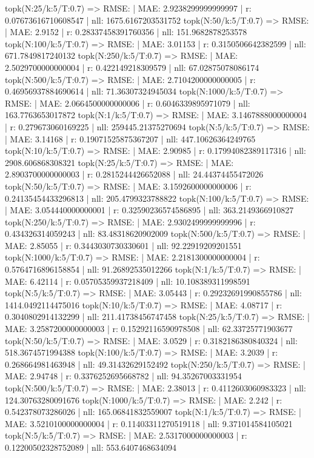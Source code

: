topk(N:25/k:5/T:0.7) => RMSE: | MAE: 2.9238299999999997 | r: 0.07673616710608547 | nll: 1675.6167203531752
topk(N:50/k:5/T:0.7) => RMSE: | MAE: 2.9152 | r: 0.28337458391760356 | nll: 151.9682878253578
topk(N:100/k:5/T:0.7) => RMSE: | MAE: 3.01153 | r: 0.3150506642382599 | nll: 671.7849817240132
topk(N:250/k:5/T:0.7) => RMSE: | MAE: 2.5029700000000004 | r: 0.422149218309579 | nll: 67.02875078086174
topk(N:500/k:5/T:0.7) => RMSE: | MAE: 2.7104200000000005 | r: 0.46956937884690614 | nll: 71.36307324945034
topk(N:1000/k:5/T:0.7) => RMSE: | MAE: 2.0664500000000006 | r: 0.6046339895971079 | nll: 163.7763653017872
topk(N:1/k:5/T:0.7) => RMSE: | MAE: 3.1467888000000004 | r: 0.279673060169225 | nll: 259445.21375270694
topk(N:5/k:5/T:0.7) => RMSE: | MAE: 3.14168 | r: 0.19071525875367207 | nll: 447.10626364249765
topk(N:10/k:5/T:0.7) => RMSE: | MAE: 2.90985 | r: 0.17994082389117316 | nll: 2908.606868308321
topk(N:25/k:5/T:0.7) => RMSE: | MAE: 2.8903700000000003 | r: 0.2815244426652088 | nll: 24.44374455472026
topk(N:50/k:5/T:0.7) => RMSE: | MAE: 3.1592600000000006 | r: 0.24135454433296813 | nll: 205.4799323788822
topk(N:100/k:5/T:0.7) => RMSE: | MAE: 3.054440000000001 | r: 0.32590236574586895 | nll: 363.2149366910827
topk(N:250/k:5/T:0.7) => RMSE: | MAE: 2.9302499999999996 | r: 0.434326314059243 | nll: 83.48318620902009
topk(N:500/k:5/T:0.7) => RMSE: | MAE: 2.85055 | r: 0.3443030730330601 | nll: 92.22919209201551
topk(N:1000/k:5/T:0.7) => RMSE: | MAE: 2.2181300000000004 | r: 0.5764716896158854 | nll: 91.26892535012266
topk(N:1/k:5/T:0.7) => RMSE: | MAE: 6.42114 | r: 0.05705359937218409 | nll: 10.108389311998591
topk(N:5/k:5/T:0.7) => RMSE: | MAE: 3.05443 | r: 0.29232691990855786 | nll: 1414.0492114475016
topk(N:10/k:5/T:0.7) => RMSE: | MAE: 4.08717 | r: 0.3040802914132299 | nll: 211.41738456747458
topk(N:25/k:5/T:0.7) => RMSE: | MAE: 3.2587200000000003 | r: 0.15292116590978508 | nll: 62.33725771903677
topk(N:50/k:5/T:0.7) => RMSE: | MAE: 3.0529 | r: 0.3182186380840324 | nll: 518.3674571994388
topk(N:100/k:5/T:0.7) => RMSE: | MAE: 3.2039 | r: 0.268664981463948 | nll: 49.31432629152492
topk(N:250/k:5/T:0.7) => RMSE: | MAE: 2.94748 | r: 0.3376252695668782 | nll: 94.35267003331954
topk(N:500/k:5/T:0.7) => RMSE: | MAE: 2.38013 | r: 0.4112603060983323 | nll: 124.30763280091676
topk(N:1000/k:5/T:0.7) => RMSE: | MAE: 2.242 | r: 0.542378073286026 | nll: 165.06841832559007
topk(N:1/k:5/T:0.7) => RMSE: | MAE: 3.5210100000000004 | r: 0.11403311270519118 | nll: 9.371014584105021
topk(N:5/k:5/T:0.7) => RMSE: | MAE: 2.5317000000000003 | r: 0.12200502328752089 | nll: 553.6407468634094
